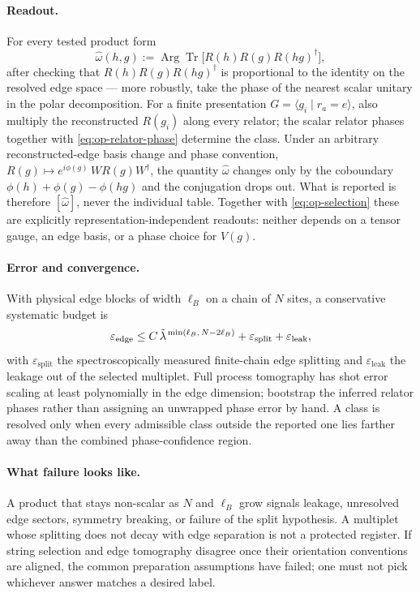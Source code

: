 \paragraph{Readout.} For every tested product form
\begin{equation}
  \hat\omega(h,g):=\operatorname{Arg}
    \operatorname{Tr}\bigl[R(h)R(g)R(hg)^{\dagger}\bigr],
  \label{eq:op-relator-phase}
\end{equation}
after checking that $R(h)R(g)R(hg)^{\dagger}$ is proportional to the identity
on the resolved edge space --- more robustly, take the phase of the nearest
scalar unitary in the polar decomposition. For a finite presentation
$G=\langle g_i\mid r_a=e\rangle$, also multiply the reconstructed $R(g_i)$
along every relator; the scalar relator phases together with
\eqref{eq:op-relator-phase} determine the class. Under an arbitrary
reconstructed-edge basis change and phase convention,
$R(g)\mapsto e^{i\phi(g)}\,W R(g)W^{\dagger}$, the quantity $\hat\omega$
changes only by the coboundary $\phi(h)+\phi(g)-\phi(hg)$ and the conjugation
drops out. What is reported is therefore $[\hat\omega]$, never the individual
table. Together with \eqref{eq:op-selection} these are explicitly
representation-independent readouts: neither depends on a tensor gauge, an
edge basis, or a phase choice for $V(g)$.

\paragraph{Error and convergence.} With physical edge blocks of width
$\ell_B$ on a chain of $N$ sites, a conservative systematic budget is
\begin{equation}
  \varepsilon_{\mathrm{edge}}
  \le C\,\tilde{\lambda}^{\,\min(\ell_B,\,N-2\ell_B)}
     +\varepsilon_{\mathrm{split}}+\varepsilon_{\mathrm{leak}},
  \label{eq:op-edge-budget}
\end{equation}
with $\varepsilon_{\mathrm{split}}$ the spectroscopically measured
finite-chain edge splitting and $\varepsilon_{\mathrm{leak}}$ the leakage out
of the selected multiplet. Full process tomography has shot error scaling at
least polynomially in the edge dimension; bootstrap the inferred relator
phases rather than assigning an unwrapped phase error by hand. A class is
resolved only when every admissible class outside the reported one lies
farther away than the combined phase-confidence region.

\paragraph{What failure looks like.} A product that stays non-scalar as $N$ and
$\ell_B$ grow signals leakage, unresolved edge sectors, symmetry breaking, or
failure of the split hypothesis. A multiplet whose splitting does not decay
with edge separation is not a protected register. If string selection and edge
tomography disagree once their orientation conventions are aligned, the common
preparation assumptions have failed; one must not pick whichever answer
matches a desired label.

